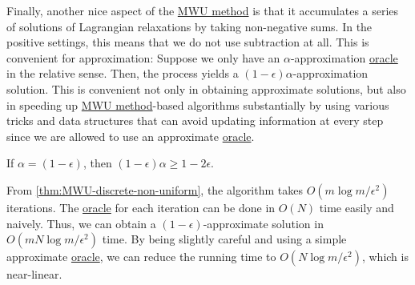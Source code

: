 Finally, another nice aspect of the \hyperref[algo:MWU-discrete-non-uniform]{MWU method} is that it accumulates a series of solutions of Lagrangian relaxations by taking non-negative sums. In the positive settings, this means that we do not use subtraction at all. This is convenient for approximation: Suppose we only have an \(\alpha \)-approximation \hyperref[eq:MWU-oracle-LP]{oracle} in the relative sense. Then, the process yields a \((1 - \epsilon )\alpha \)-approximation solution. This is convenient not only in obtaining approximate solutions, but also in speeding up \hyperref[algo:MWU-discrete-non-uniform]{MWU method}-based algorithms substantially by using various tricks and data structures that can avoid updating information at every step since we are allowed to use an approximate \hyperref[eq:MWU-oracle-LP]{oracle}.

\begin{note}
	If \(\alpha = (1 - \epsilon )\), then \((1 - \epsilon ) \alpha \geq 1 - 2\epsilon \).
\end{note}

\begin{remark}
	From \autoref{thm:MWU-discrete-non-uniform}, the algorithm takes \(O(m \log m / \epsilon ^2)\) iterations. The \hyperref[eq:MWU-oracle-LP]{oracle} for each iteration can be done in \(O(N)\) time easily and naively. Thus, we can obtain a \((1 - \epsilon )\)-approximate solution in \(O(m N \log m / \epsilon ^2)\) time. By being slightly careful and using a simple approximate \hyperref[eq:MWU-oracle-LP]{oracle}, we can reduce the running time to \(O(N \log m / \epsilon ^2)\), which is near-linear.
\end{remark}